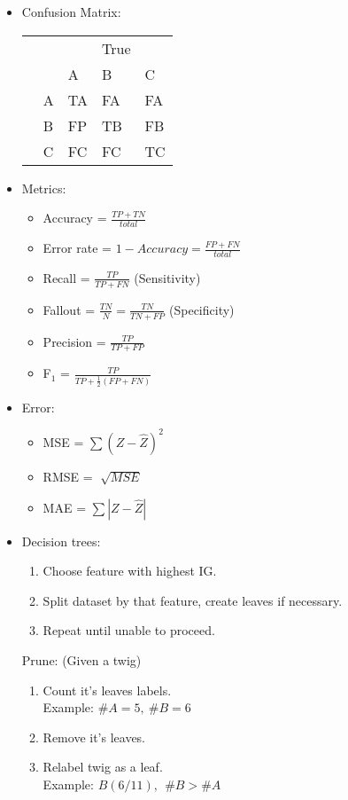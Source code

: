 \documentclass[twocolumn, 10pt]{article}
\begin{document}
\begin{itemize}[leftmargin=*, itemsep=0pt]
    \item Confusion Matrix:
    \begin{tabular}{ | M{0.5em} M{0.5em} | M{2em} M{2em} M{2em} | } \hline
        & & & True & \\
        & & A & B & C \\\hline
         & A & TA & FA & FA \\
        & B & FP & TB & FB \\
        & C & FC & FC & TC \\\hline
    \end{tabular}
    
    \item Metrics:
    \begin{itemize}[topsep=0pt, itemsep=0pt]
        \item Accuracy = $\displaystyle \frac{TP+TN}{total}$
        \item Error rate = $\displaystyle 1-Accuracy=\frac{FP+FN}{total}$
        \item Recall = $\displaystyle \frac{TP}{TP+FN}$ (Sensitivity)
        \item Fallout = $\displaystyle \frac{TN}{N}=\frac{TN}{TN+FP}$ (Specificity)
        \item Precision = $\displaystyle \frac{TP}{TP+FP}$
        \item F$_1$ = $\displaystyle \frac{TP}{TP+\frac{1}{2}(FP+FN)}$
    \end{itemize}
    
    \item Error:
    \begin{itemize}[topsep=0pt, itemsep=0pt]
        \item MSE = $\sum(Z-\hat{Z})^2$
        \item RMSE = $\sqrt[]{MSE}$
        \item MAE = $\sum|Z-\hat{Z}|$
    \end{itemize}

    \item Decision trees:
    \begin{enumerate}[topsep=0pt, itemsep=0pt]
        \item Choose feature with highest IG.
        \item Split dataset by that feature, create leaves if necessary.
        \item Repeat until unable to proceed.
    \end{enumerate}
    Prune: (Given a twig)
    \begin{enumerate}[topsep=0pt, itemsep=0pt]
        \item Count it's leaves labels. \\ Example: $\#A=5, \ \#B=6$
        \item Remove it's leaves.
        \item Relabel twig as a leaf. \\ Example: $B(6/11), \ \ \#B>\#A$ 
    \end{enumerate}


\end{itemize}
\end{document}

